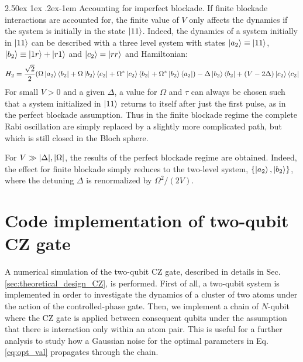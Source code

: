 \documentclass[rmp,10pt,onecolumn,fleqn,notitlepage]{revtex4-1}
\makeatletter
\renewcommand{\paragraph}{%
    \@startsection{paragraph}{4}%
    {\z@}{2.50ex \@plus 1ex \@minus .2ex}{-1em}%
    {\bf\sffamily}%
}
\makeatother
\begin{document}
\paragraph{Accounting for imperfect blockade.} If finite blockade interactions are accounted for, the finite value of $V$ only affects the dynamics if the system is initially in the state $\left\vert{11}\right\rangle$. Indeed, the dynamics of a system initially in $\left\vert{11}\right\rangle$ can be described with a three level system with states $\left\vert{a_2}\right\rangle\equiv\left\vert{11}\right\rangle$, $\left\vert{b_2}\right\rangle\equiv \left\vert{1r}\right\rangle+\left\vert{r1}\right\rangle$ and $\left\vert{c_2}\right\rangle=\left\vert{rr}\right\rangle$ and Hamiltonian:
    \begin{equation}
        H_2 = \frac{\sqrt{2}}{2} \qty( \Omega \left\vert{a_2}\right\rangle\left\langle{b_2}\right\vert + \Omega \left\vert{b_2}\right\rangle\left\langle{c_2}\right\vert +
        \Omega^* \left\vert{c_2}\right\rangle\left\langle{b_2}\right\vert + \Omega^*\left\vert{b_2}\right\rangle\left\langle{a_2}\right\vert) 
        - \Delta \left\vert{b_2}\right\rangle\left\langle{b_2}\right\vert 
        + (V-2\Delta)\left\vert{c_2}\right\rangle\left\langle{c_2}\right\vert
        \label{eq:imperfect-H_2}
    \end{equation}
For small $V>0$ and a given $\Delta$, a value for $\Omega$ and $\tau$ can always be chosen such that a system initialized in $\left\vert{11}\right\rangle$ returns to itself after just the first pulse, as in the perfect blockade assumption. Thus in the finite blockade regime the complete Rabi oscillation are simply replaced by a slightly more complicated path, but which is still closed in the Bloch sphere.

For $V \gg \abs{\Delta},\abs{\Omega}$, the results of the perfect blockade regime are obtained. Indeed, the effect for finite blockade simply reduces to the two-level system, $\{ \left\vert{a_2}\right\rangle, \left\vert{b_2}\right\rangle\}$, where the detuning $\Delta$ is renormalized by $\Omega^2/(2V)$. 





\clearpage


\section{Code implementation of two-qubit CZ gate}
\label{sec:code_implementation}
A numerical simulation of the two-qubit CZ gate, described in details in Sec. \ref{sec:theoretical_design_CZ}, is performed. First of all, a two-qubit system is implemented in order to investigate the dynamics of a cluster of two atoms under the action of the controlled-phase gate.
Then, we implement a chain of $N$-qubit where the CZ gate is applied between consequent qubits under the assumption that there is interaction only within an atom pair. This is useful for a further analysis to study how a Gaussian noise for the optimal parameters in Eq. \eqref{eq:opt_val} propagates through the chain.
\end{document}
